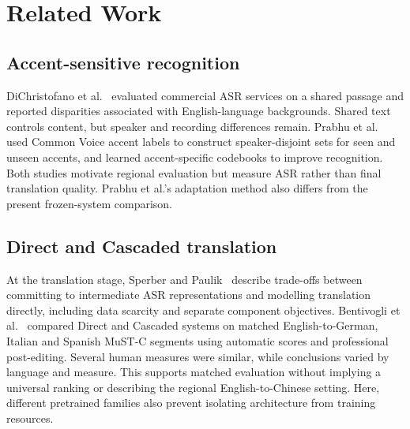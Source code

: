 \section{Related Work}
\label{sec:related-work}

\subsection{Accent-sensitive recognition}
DiChristofano et al.~\cite{dichristofano2022global} evaluated commercial ASR
services on a shared passage and reported disparities associated with
English-language backgrounds. Shared text controls content, but speaker and
recording differences remain.
Prabhu et al.~\cite{prabhu2023accentcodebooks} used Common Voice accent labels to
construct speaker-disjoint sets for seen and unseen accents, and learned
accent-specific codebooks to improve recognition. Both studies motivate regional
evaluation but measure ASR rather than final translation quality. Prabhu et al.'s
adaptation method also differs from the present frozen-system comparison.

\subsection{Direct and Cascaded translation}
At the translation stage, Sperber and Paulik~\cite{sperber2020endtoend} describe trade-offs between
committing to intermediate ASR representations and modelling translation
directly, including data scarcity and separate component objectives.
Bentivogli et al.~\cite{bentivogli2021cascade} compared Direct and Cascaded
systems on matched English-to-German, Italian and Spanish MuST-C segments using
automatic scores and professional post-editing. Several human measures were
similar, while conclusions varied by language and measure. This supports matched
evaluation without implying a universal ranking or describing the regional
English-to-Chinese setting. Here, different pretrained families also prevent
isolating architecture from training resources.

